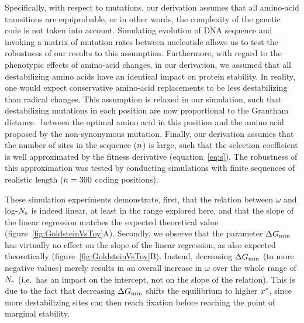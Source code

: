 Specifically, with respect to mutations, our derivation assumes that all amino-acid transitions are equiprobable, or in other words, the complexity of the genetic code is not taken into account.
Simulating evolution of {DNA} sequence and invoking a matrix of mutation rates between nucleotide allows us to test the robustness of our results to this assumption.
Furthermore, with regard to the phenotypic effects of amino-acid changes, in our derivation, we assumed that all destabilizing amino acids have an identical impact on protein stability.
In reality, one would expect conservative amino-acid replacements to be less destabilizing than radical changes.
This assumption is relaxed in our simulation, such that destabilizing mutations in each position are now proportional to the Grantham distance~\citep{Grantham1974} between the optimal amino acid in this position and the amino acid proposed by the {non-synonymous} mutation.
Finally, our derivation assumes that the number of sites in the sequence ($n$) is large, such that the selection coefficient is well approximated by the fitness derivative (equation~\ref{eq:s}).
The robustness of this approximation was tested by conducting simulations with finite sequences of realistic length ($n=300$ coding positions).

These simulation experiments demonstrate, first, that the relation between $\omega$ and log-$N_{\text{e}}$ is indeed linear, at least in the range explored here, and that the slope of the linear regression matches the expected theoretical value (figure~\ref{fig:GoldsteinVsToy}A).
Secondly, we observe that the parameter $\Delta G_{\text{min}}$ has virtually no effect on the slope of the linear regression, as also expected theoretically (figure~\ref{fig:GoldsteinVsToy}B).
Instead, decreasing $\Delta G_{\text{min}}$ (to more negative values) merely results in an overall increase in $\omega$ over the whole range of $N_{\text{e}}$ (i.e.~has an impact on the intercept, not on the slope of the relation).
This is due to the fact that decreasing $\Delta G_{\text{min}}$ shifts the equilibrium to higher $x^{*}$, since more destabilizing sites can then reach fixation before reaching the point of marginal stability.

